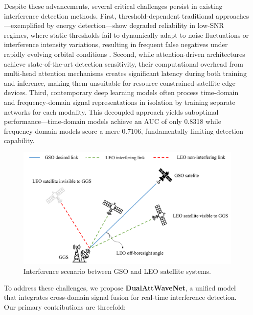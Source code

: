 \documentclass[conference]{IEEEtran}
\begin{document}
Despite these advancements, several critical challenges persist in existing interference detection methods. First, threshold-dependent traditional approaches—exemplified by energy detection—show degraded reliability in low-SNR regimes, where static thresholds fail to dynamically adapt to noise fluctuations or interference intensity variations, resulting in frequent false negatives under rapidly evolving orbital conditions \cite{saifaldawlaGenAIBasedModelsNGSO2024}. Second, while attention-driven architectures achieve state-of-the-art detection sensitivity, their computational overhead from multi-head attention mechanisms creates significant latency during both training and inference, making them unsuitable for resource-constrained satellite edge devices. Third, contemporary deep learning models often process time-domain and frequency-domain signal representations in isolation by training separate networks for each modality. This decoupled approach yields suboptimal performance—time-domain models achieve an AUC of only 0.8318 while frequency-domain models score a mere 0.7106, fundamentally limiting detection capability.

\begin{figure}[t!]
    \centering
    \includegraphics[width=\linewidth]{system-model.pdf}
    \caption{Interference scenario between GSO and LEO satellite systems.}
    \label{fig:interference-scenario}
\end{figure}

To address these challenges, we propose \textbf{DualAttWaveNet}, a unified model that integrates cross-domain signal fusion for real-time interference detection. Our primary contributions are threefold:
\end{document}
